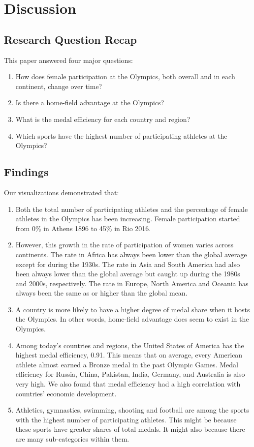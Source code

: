 \documentclass[12pt]{article}
\begin{document}
\section{Discussion}
\subsection{Research Question Recap}
This paper answered four major questions:
\begin{enumerate}
    \item How does female participation at the Olympics, both overall and in each continent, change over time?
    \item Is there a home-field advantage at the Olympics?
    \item What is the medal efficiency for each country and region?
    \item Which sports have the highest number of participating athletes at the Olympics?
\end{enumerate}

\subsection{Findings}
Our visualizations demonstrated that:
\begin{enumerate}
    \item Both the total number of participating athletes and the percentage of female athletes in the Olympics has been increasing. Female participation started from 0\% in Athens 1896 to 45\% in Rio 2016. 
    \item However, this growth in the rate of participation of women varies across continents. The rate in Africa has always been lower than the global average except for during the 1930s. The rate in Asia and South America had also been always lower than the global average but caught up during the 1980s and 2000s, respectively. The rate in Europe, North America and Oceania has always been the same as or higher than the global mean.
    \item A country is more likely to have a higher degree of medal share when it hosts the Olympics. In other words, home-field advantage does seem to exist in the Olympics. 
    \item Among today’s countries and regions, the United States of America has the highest medal efficiency, 0.91. This means that on average, every American athlete almost earned a Bronze medal in the past Olympic Games. Medal efficiency for Russia, China, Pakistan, India, Germany, and Australia is also very high. We also found that medal efficiency had a high correlation with countries' economic development. 
    \item Athletics, gymnastics, swimming, shooting and football are among the sports with the highest number of participating athletes. This might be because these sports have greater shares of total medals. It might also because there are many sub-categories within them.
\end{enumerate}
\end{document}

